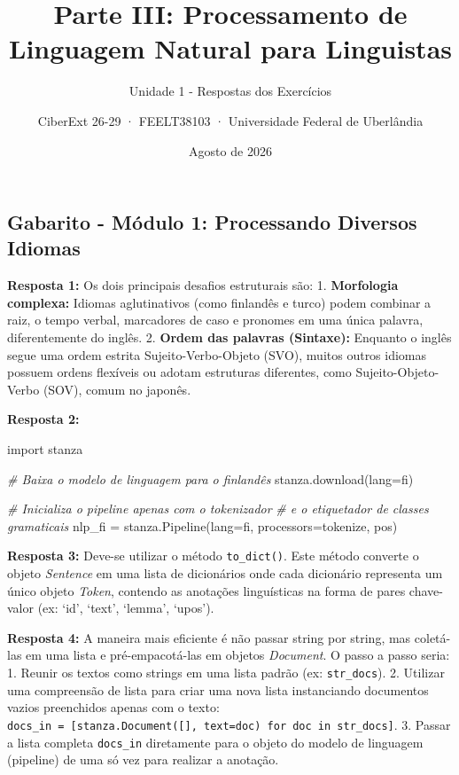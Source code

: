 \documentclass[
  brazilian,
]{article}
\title{Parte III: Processamento de Linguagem Natural para Linguistas}
\subtitle{Unidade 1 - Respostas dos Exercícios}
\author{CiberExt 26-29 · FEELT38103 · Universidade Federal de
Uberlândia}
\date{Agosto de 2026}
\newenvironment{Shaded}{}{}
\newcommand{\CommentTok}[1]{\textcolor[rgb]{0.38,0.63,0.69}{\textit{#1}}}
\newcommand{\ImportTok}[1]{#1}
\newcommand{\NormalTok}[1]{#1}
\newcommand{\OperatorTok}[1]{\textcolor[rgb]{0.40,0.40,0.40}{#1}}
\newcommand{\StringTok}[1]{\textcolor[rgb]{0.25,0.44,0.63}{#1}}
\begin{document}
\maketitle

\hypertarget{gabarito---muxf3dulo-1-processando-diversos-idiomas}{%
\subsection{Gabarito - Módulo 1: Processando Diversos
Idiomas}\label{gabarito---muxf3dulo-1-processando-diversos-idiomas}}

\textbf{Resposta 1:} Os dois principais desafios estruturais são: 1.
\textbf{Morfologia complexa:} Idiomas aglutinativos (como finlandês e
turco) podem combinar a raiz, o tempo verbal, marcadores de caso e
pronomes em uma única palavra, diferentemente do inglês. 2.
\textbf{Ordem das palavras (Sintaxe):} Enquanto o inglês segue uma ordem
estrita Sujeito-Verbo-Objeto (SVO), muitos outros idiomas possuem ordens
flexíveis ou adotam estruturas diferentes, como Sujeito-Objeto-Verbo
(SOV), comum no japonês.

\textbf{Resposta 2:}

\begin{Shaded}
\begin{Highlighting}[]
\ImportTok{import}\NormalTok{ stanza}

\CommentTok{\# Baixa o modelo de linguagem para o finlandês}
\NormalTok{stanza.download(lang}\OperatorTok{=}\StringTok{\textquotesingle{}fi\textquotesingle{}}\NormalTok{)}

\CommentTok{\# Inicializa o pipeline apenas com o tokenizador }
\CommentTok{\# e o etiquetador de classes gramaticais}
\NormalTok{nlp\_fi }\OperatorTok{=}\NormalTok{ stanza.Pipeline(lang}\OperatorTok{=}\StringTok{\textquotesingle{}fi\textquotesingle{}}\NormalTok{, processors}\OperatorTok{=}\StringTok{\textquotesingle{}tokenize, pos\textquotesingle{}}\NormalTok{)}
\end{Highlighting}
\end{Shaded}

\textbf{Resposta 3:} Deve-se utilizar o método \texttt{to\_dict()}. Este
método converte o objeto \emph{Sentence} em uma lista de dicionários
onde cada dicionário representa um único objeto \emph{Token}, contendo
as anotações linguísticas na forma de pares chave-valor (ex: `id',
`text', `lemma', `upos').

\textbf{Resposta 4:} A maneira mais eficiente é não passar string por
string, mas coletá-las em uma lista e pré-empacotá-las em objetos
\emph{Document}. O passo a passo seria: 1. Reunir os textos como strings
em uma lista padrão (ex: \texttt{str\_docs}). 2. Utilizar uma
compreensão de lista para criar uma nova lista instanciando documentos
vazios preenchidos apenas com o texto:
\texttt{docs\_in\ =\ {[}stanza.Document({[}{]},\ text=doc)\ for\ doc\ in\ str\_docs{]}}.
3. Passar a lista completa \texttt{docs\_in} diretamente para o objeto
do modelo de linguagem (pipeline) de uma só vez para realizar a
anotação.
\end{document}
